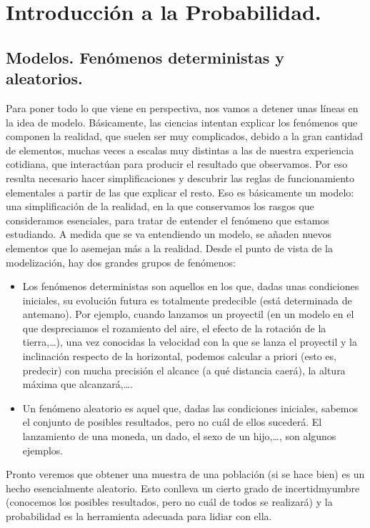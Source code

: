 
\section*{Introducción a la Probabilidad.}
\label{part02:intro}

\subsection*{Modelos. Fenómenos deterministas y aleatorios.}

Para poner todo lo que viene en perspectiva, nos vamos a detener unas líneas en la idea de {\sf
modelo}. Básicamente, las ciencias intentan explicar los fen\'omenos que componen la
realidad, que suelen ser muy complicados, debido a la gran cantidad de elementos, muchas veces a
escalas muy distintas a las de nuestra experiencia cotidiana, que interactúan para producir el
resultado que observamos. Por eso resulta necesario hacer simplificaciones y descubrir las reglas
de funcionamiento elementales a partir de las que explicar el resto. Eso es básicamente un modelo:
una simplificación de la realidad, en la que conservamos los rasgos que consideramos esenciales,
para tratar de entender el fenómeno que estamos estudiando. A medida que se va entendiendo un
modelo, se añaden nuevos elementos que lo asemejan m\'as a la realidad. Desde el punto de vista de
la modelizaci\'on, hay dos grandes grupos de fen\'omenos:
\begin{itemize}
    \item Los {\sf fenómenos deterministas}  son aquellos en los
        que, dadas unas condiciones iniciales, su evoluci\'on futura es totalmente predecible
        (est\'a determinada de antemano). Por ejemplo, cuando lanzamos un proyectil (en un modelo
        en el que despreciamos el rozamiento del aire, el efecto de la rotaci\'on de la 			
        tierra,\dots), una vez conocidas la velocidad con la que se lanza el proyectil y la
        inclinaci\'on respecto de la horizontal, podemos calcular a priori (esto es, predecir)
        con mucha precisión el alcance (a qu\'e distancia caer\'a), la altura m\'axima que
        alcanzar\'a,\dots.
    \item Un {\sf fen\'omeno aleatorio}  	es aquel que, dadas las
        condiciones iniciales, sabemos el conjunto de posibles resultados, pero no cu\'al de
        ellos suceder\'a. El lanzamiento de una moneda, un dado, el sexo de un hijo,\dots, son
        algunos ejemplos.
\end{itemize}
Pronto veremos que obtener una muestra de una poblaci\'on (si se hace bien) es un hecho
esencialmente aleatorio. Esto conlleva un cierto grado de incertidmyumbre (conocemos los posibles
resultados, pero no cu\'al de todos se realizar\'a) y la probabilidad es la herramienta adecuada
para lidiar con ella.

